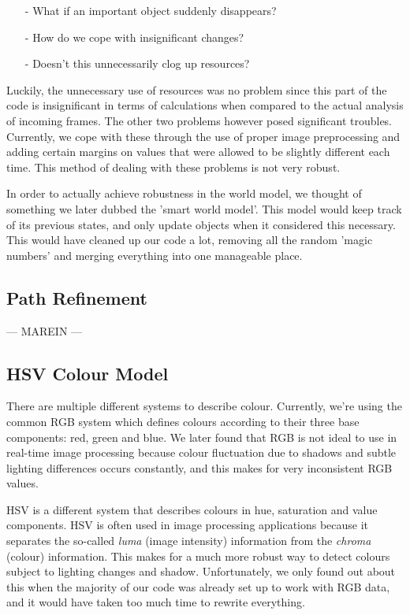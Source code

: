 \documentclass[10pt, abstracton]{scrartcl}
\begin{document}
\begin{appendices}
\begin{itemize}
\item[-] What if an important object suddenly disappears?
\item[-] How do we cope with insignificant changes?
\item[-] Doesn't this unnecessarily clog up resources?
\end{itemize}

Luckily, the unnecessary use of resources was no problem since this part of the code is insignificant in terms of calculations when compared to the actual analysis of incoming frames. The other two problems however posed significant troubles. Currently, we cope with these through the use of proper image preprocessing and adding certain margins on values that were allowed to be slightly different each time. This method of dealing with these problems is not very robust.

In order to actually achieve robustness in the world model, we thought of something we later dubbed the 'smart world model'. This model would keep track of its previous states, and only update objects when it considered this necessary. This would have cleaned up our code a lot, removing all the random 'magic numbers' and merging everything into one manageable place.

\subsection{Path Refinement}
\label{sec:pathrefinement}
---
MAREIN
---

\subsection{HSV Colour Model}
There are multiple different systems to describe colour. Currently, we're using the common RGB system which defines colours according to their three base components: red, green and blue. We later found that RGB is not ideal to use in real-time image processing because colour fluctuation due to shadows and subtle lighting differences occurs constantly, and this makes for very inconsistent RGB values.

HSV is a different system that describes colours in hue, saturation and value components. HSV is often used in image processing applications because it separates the so-called \textit{luma} (image intensity) information from the \textit{chroma} (colour) information. This makes for a much more robust way to detect colours subject to lighting changes and shadow. Unfortunately, we only found out about this when the majority of our code was already set up to work with RGB data, and it would have taken too much time to rewrite everything.


\end{appendices}
\end{document}
